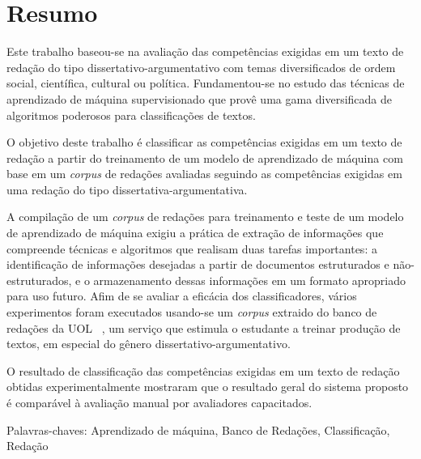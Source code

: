\chapter*{Resumo}

\noindent Este trabalho baseou-se na avaliação das competências exigidas em um 
texto de redação do tipo dissertativo-argumentativo com temas diversificados 
de ordem social, científica, cultural ou política. Fundamentou-se no estudo 
das técnicas de aprendizado de máquina supervisionado que provê uma gama 
diversificada de algoritmos poderosos para classificações de textos.

O objetivo deste trabalho é classificar as competências exigidas em um texto de 
redação a partir do treinamento de um modelo de aprendizado de máquina com
base em um \textit{corpus} de redações avaliadas seguindo as competências 
exigidas em uma redação do tipo dissertativa-argumentativa.

A compilação de um \textit{corpus} de redações para treinamento e teste de um 
modelo de aprendizado de máquina exigiu a prática de extração de informações 
que compreende técnicas e algoritmos que realisam duas tarefas importantes: a 
identificação de informações desejadas a partir de documentos estruturados e 
não-estruturados, e o armazenamento dessas informações em um formato apropriado 
para uso futuro. Afim de se avaliar a eficácia dos classificadores, 
vários experimentos foram executados usando-se um \textit{corpus} extraido do 
banco de redações da UOL ~\cite{uol_banco_redacoes:2017}, um serviço que 
estimula o estudante a treinar produção de textos, em especial do gênero 
dissertativo-argumentativo. 

O resultado de classificação das competências exigidas em um texto de redação 
obtidas experimentalmente mostraram que o resultado geral do sistema proposto é 
comparável à avaliação manual por avaliadores capacitados.

Palavras-chaves: Aprendizado de máquina, Banco de Redações, Classificação,
Redação